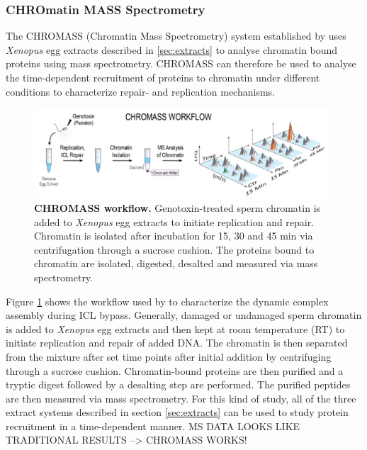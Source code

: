 \subsubsection{CHROmatin MASS Spectrometry}
\label{sec:chromass}
The CHROMASS (Chromatin Mass Spectrometry) system established by \cite{Raschle.2015} uses \textit{Xenopus} egg extracts described in \ref{sec:extracts} to analyse chromatin bound proteins using mass spectrometry. CHROMASS can therefore be used to analyse the time-dependent recruitment of proteins to chromatin under different conditions to characterize repair- and replication mechanisms.
\begin{figure}[H]
    \centering
    \includegraphics[width=0.98\textwidth]{resources/images/Intro/chromass.PNG}
    \caption[CHROMASS workflow.]{\textbf{CHROMASS workflow.} Genotoxin-treated sperm chromatin is added to \textit{Xenopus} egg extracts to initiate replication and repair. Chromatin is isolated after incubation for 15, 30 and 45 min via centrifugation through a sucrose cushion. The proteins bound to chromatin are isolated, digested, desalted and measured via mass spectrometry.\\ \citep{Raschle.2015}}
    \label{fig:chromass}
\end{figure}
Figure \ref{fig:chromass} shows the workflow used by \cite{Raschle.2015} to characterize the dynamic complex assembly during ICL bypass. Generally, damaged or undamaged sperm chromatin is added to \textit{Xenopus} egg extracts and then kept at room temperature (RT) to initiate replication and repair of added DNA. The chromatin is then separated from the mixture after set time points after initial addition by centrifuging through a sucrose cushion. Chromatin-bound proteins are then purified and a tryptic digest followed by a desalting step are performed. The purified peptides are then measured via mass spectrometry. For this kind of study, all of the three extract systems described in section \ref{sec:extracts} can be used to study protein recruitment in a time-dependent manner. MS DATA LOOKS LIKE TRADITIONAL RESULTS --> CHROMASS WORKS!

